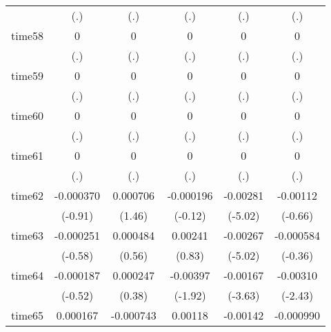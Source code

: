 \begin{table}[htbp]
\begin{tabular}{l*{5}{c}}
            &         (.)         &         (.)         &         (.)         &         (.)         &         (.)         \\
time58      &           0         &           0         &           0         &           0         &           0         \\
            &         (.)         &         (.)         &         (.)         &         (.)         &         (.)         \\
time59      &           0         &           0         &           0         &           0         &           0         \\
            &         (.)         &         (.)         &         (.)         &         (.)         &         (.)         \\
time60      &           0         &           0         &           0         &           0         &           0         \\
            &         (.)         &         (.)         &         (.)         &         (.)         &         (.)         \\
time61      &           0         &           0         &           0         &           0         &           0         \\
            &         (.)         &         (.)         &         (.)         &         (.)         &         (.)         \\
time62      &   -0.000370         &    0.000706         &   -0.000196         &    -0.00281\sym{***}&    -0.00112         \\
            &     (-0.91)         &      (1.46)         &     (-0.12)         &     (-5.02)         &     (-0.66)         \\
time63      &   -0.000251         &    0.000484         &     0.00241         &    -0.00267\sym{***}&   -0.000584         \\
            &     (-0.58)         &      (0.56)         &      (0.83)         &     (-5.02)         &     (-0.36)         \\
time64      &   -0.000187         &    0.000247         &    -0.00397         &    -0.00167\sym{***}&    -0.00310\sym{*}  \\
            &     (-0.52)         &      (0.38)         &     (-1.92)         &     (-3.63)         &     (-2.43)         \\
time65      &    0.000167         &   -0.000743         &     0.00118         &    -0.00142\sym{*}  &   -0.000990         \\

\end{tabular}
\end{table}
